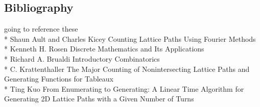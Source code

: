\documentclass{article}
\begin{document}
 

 
 
 \subsection*{Bibliography}
 going to reference these\\*
 Shaun Ault and Charles Kicey Counting Lattice Paths Using Fourier Methods\\*
 Kenneth H. Rosen Discrete Mathematics and Its Applications\\*
 Richard A. Brualdi Introductory Combinatorics\\*
 C. Krattenthaller The Major Counting of Nonintersecting Lattice Paths and Generating Functions for Tableaux\\*
 Ting Kuo From Enumerating to Generating: A Linear Time Algorithm for Generating 2D Lattice Paths with a Given Number of Turns
 

 
\end{document}
